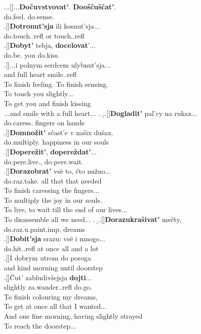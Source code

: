 \ex.\label{ex:poem}\a.\label{poem:a}\ag.[]$\ldots$\textbf{Do\v{c}uvstvovat'}. \textbf{Doo\v{s}\v{c}u\v{s}\v{c}at'}.\\
do.feel. do.sense.\\
\bg.[]\textbf{Dotronut'sja} ili kosnut'sja$\ldots$\\
do.touch..refl or touch..refl\\
\bg.[]\textbf{Dobyt'} tebja, \textbf{docelovat}'$\ldots$\\
do.be. you do.kiss.\\
\bg.[]$\ldots$i polnym serdcem ulybnut'sja$\ldots$\\
and full heart smile..refl\\
\trans To finish feeling. To finish sensing.\\
To touch you slightly$\ldots$\\
To get you and finish kissing\\
$\ldots$and smile with a full heart$\ldots$
\z.
\b.\label{poem:b}\ag.[]\textbf{Dogladit'} pal'cy na rukax$\ldots$\\
do.caress. fingers on hands\\
\bg.[]\textbf{Domno\v{z}it'} s\v{c}ast'e v na\v{s}ix du\v{s}ax.\\
do.multiply. happiness in our souls\\
\bg.[]\textbf{Dopere\v{z}it'}, \textbf{dopere\v{z}dat'}$\ldots$\\
do.pere.live., do.pere.wait.\\
\bg.[]\textbf{Dorazobrat'} vs\"{e} to, \v{c}to nu\v{z}no$\ldots$ \\
do.raz.take. all that that needed\\
\trans To finish caressing the fingers$\ldots$\\
To multiply the joy in our souls.\\
To live,  to wait till the end of our lives$\ldots$\\
To disassemble all we need$\ldots$
\z.
\b.\label{poem:c}\ag.[]\textbf{Dorazukra\v{s}ivat'} me\v{c}ty,\\
do.raz.u.paint.imp. dreams\\
\bg.[]\textbf{Dobit'sja} srazu: vs\"{e} i mnogo$\ldots$\\
do.hit..refl {at once} all and {a lot}\\
\bg.[]I dobrym utrom do poroga\\
and kind morning until doorstep\\
\bg.[]\v{C}ut' zabludiv\v{s}ejsja \textbf{dojti}$\ldots$\\
slightly za.wander..refl do.go.\\
\trans To finish colouring my dreams,\\
To get at once all that I wanted$\ldots$\\
And one fine morning, having slightly strayed\\
To reach the doorstep$\ldots$\\

